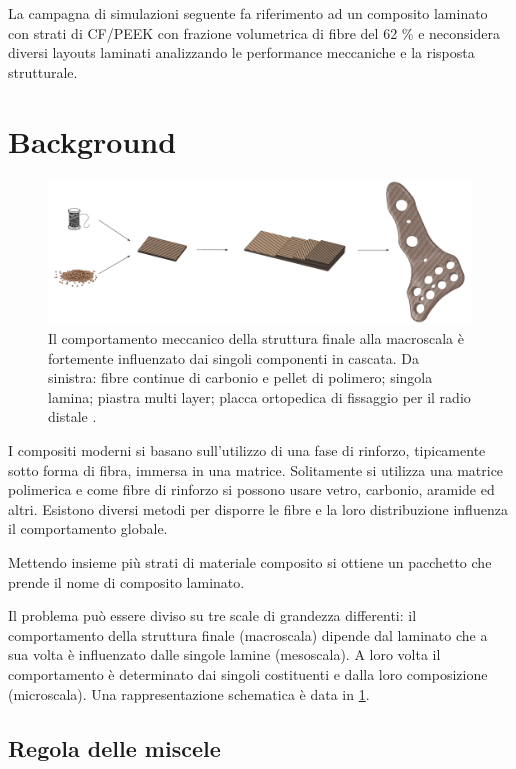 \documentclass[a4paper,num-refs]{oup-contemporary}
\begin{document}
La campagna di simulazioni seguente fa riferimento ad un composito laminato con strati di CF/PEEK con frazione volumetrica di fibre del 62 \% e neconsidera diversi layouts laminati analizzando le performance meccaniche e la risposta strutturale.  



\section{Background}

\begin{figure}[bt!]
	\includegraphics[width=\textwidth]{laminate_figures.pdf}
	\caption{Il comportamento meccanico della struttura finale alla macroscala è fortemente influenzato dai singoli componenti in cascata. Da sinistra: fibre continue di carbonio e pellet di polimero; singola lamina; piastra multi layer; placca ortopedica di fissaggio per il radio distale \citep{MUGNAI2018877,DISTAL}.}
\label{fig:laminates_general}
\end{figure}

I compositi moderni si basano sull'utilizzo di una fase di rinforzo, tipicamente sotto forma di fibra, immersa in una matrice. Solitamente si utilizza una matrice polimerica e come fibre di rinforzo si possono usare vetro, carbonio, aramide ed altri. Esistono diversi metodi per disporre le fibre e la loro distribuzione influenza il comportamento globale. 

Mettendo insieme più strati di materiale composito si ottiene un pacchetto che prende il nome di composito laminato.

Il problema può essere diviso su tre scale di grandezza differenti: il comportamento della struttura finale (macroscala) dipende dal laminato che a sua volta è influenzato dalle singole lamine (mesoscala). A loro volta il comportamento è determinato dai singoli costituenti e dalla loro composizione (microscala). Una rappresentazione schematica è data in \cref{fig:laminates_general}.


\subsection{Regola delle miscele}
\end{document}
